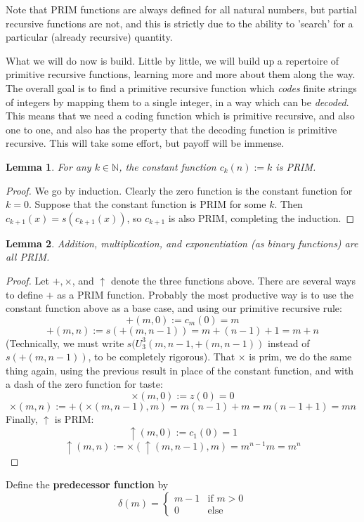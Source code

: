 \documentclass{article}
\theoremstyle{definition}
\theoremstyle{plain}
\theoremstyle{theorem}
\newtheorem{lemma}{Lemma}[section]
\begin{document}
Note that PRIM functions are always defined for all natural numbers, but partial recursive functions are not, and this is strictly due to the ability to 'search' for a particular (already recursive) quantity.
\par What we will do now is build. Little by little, we will build up a repertoire of primitive recursive functions, learning more and more about them along the way. The overall goal is to find a primitive recursive function which \textit{codes} finite strings of integers by mapping them to a single integer, in a way which can be \textit{decoded}. This means that we need a coding function which is primitive recursive, and also one to one, and also has the property that the decoding function is primitive recursive. This will take some effort, but payoff will be immense.
\begin{lemma}
    For any $k \in \mathbb{N}$, the constant function $c_k(n):=k$ is PRIM.
\end{lemma}
\begin{proof}
    We go by induction. Clearly the zero function is the constant function for $k=0$. Suppose that the constant function is PRIM for some $k$. Then $c_{k+1}(x)=s(c_{k+1}(x))$, so $c_{k+1}$ is also PRIM, completing the induction.
\end{proof}
\begin{lemma}
    Addition, multiplication, and exponentiation (as binary functions) are all PRIM. 
\end{lemma}
\begin{proof}
    Let $+,\times$, and $\uparrow$ denote the three functions above. There are several ways to define $+$ as a PRIM function. Probably the most productive way is to use the constant function above as a base case, and using our primitive recursive rule: 
    \[+(m,0) := c_m(0) = m\]
    \[+(m,n) := s(+(m,n-1))=m+(n-1)+1=m+n\]
    (Technically, we must write $s(U_3^3(m,n-1,+(m,n-1))$ instead of $s(+(m,n-1))$, to be completely rigorous). That $\times$ is prim, we do the same thing again, using the previous result in place of the constant function, and with a dash of the zero function for taste:
    \[\times(m,0) := z(0) = 0 \]
    \[\times(m,n) := +(\times(m,n-1),m) = m(n-1)+m = m(n-1+1) = mn \]
    Finally, $\uparrow$ is PRIM:
    \[ \uparrow(m,0) := c_1(0) = 1 \]
    \[ \uparrow(m,n) := \times(\uparrow (m,n-1),m) = m^{n-1}m = m^n \]
\end{proof}
Define the \textbf{predecessor function} by 
\[
    \delta(m) = \begin{cases}
                    m-1 & \textrm{if $m>0$} \\
                    0 & \textrm{else}
                \end{cases}
\]
\end{document}
